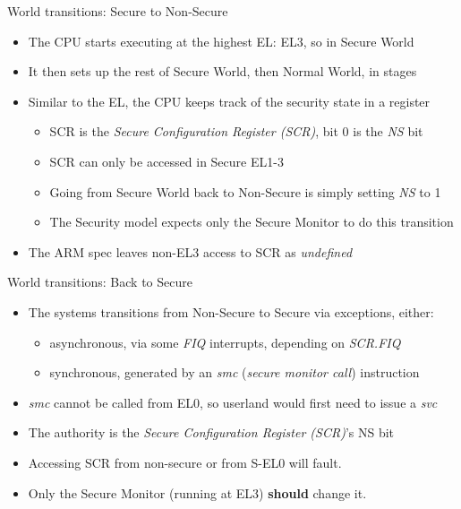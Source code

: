 \begin{frame}{World transitions: Secure to Non-Secure}
  \begin{itemize}
    \item The CPU starts executing at the highest EL: EL3, so in Secure World
    \item It then sets up the rest of Secure World, then Normal World, in stages
    \item Similar to the EL, the CPU keeps track of the security state in a register
    \begin{itemize}
      \item SCR is the \textit{Secure Configuration Register (SCR)}, bit 0 is the \textit{NS} bit
      \item SCR can only be accessed in Secure EL1-3
      \item Going from Secure World back to Non-Secure is simply setting \textit{NS} to 1
      \item The Security model expects only the Secure Monitor to do this transition
    \end{itemize}
    \item The ARM spec leaves non-EL3 access to SCR as \textit{undefined}
  \end{itemize}
\end{frame}

\begin{frame}{World transitions: Back to Secure}
  \begin{itemize}
    \item The systems transitions from Non-Secure to Secure via exceptions, either:
    \begin{itemize}
      \item asynchronous, via some \textit{FIQ} interrupts, depending on \textit{SCR.FIQ}
      \item synchronous, generated by an \textit{smc} (\textit{secure monitor call}) instruction
    \end{itemize}
    \item \textit{smc} cannot be called from EL0, so userland would first need to issue a \textit{svc}
    \item The authority is the \textit{Secure Configuration Register (SCR)}'s NS bit
    \item Accessing SCR from non-secure or from S-EL0 will fault.
    \item Only the Secure Monitor (running at EL3) \textbf{should} change it.
  \end{itemize}
\end{frame}

